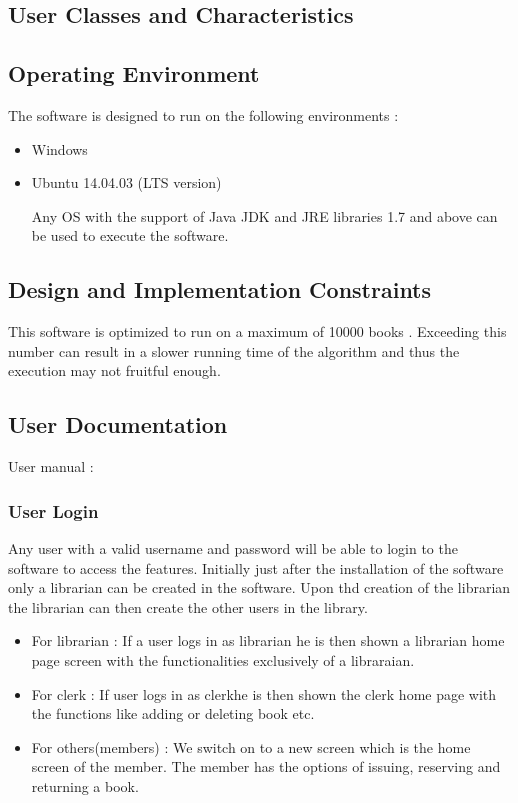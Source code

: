 \documentclass{article}
\begin{document}
\subsection{User Classes and Characteristics}

\subsection{Operating Environment}
The software is designed to run on the following environments :
\begin{itemize}
\item Windows 
\item Ubuntu 14.04.03 (LTS version)

Any OS with the support of Java JDK and JRE libraries 1.7 and above can be used to execute the software.
\end{itemize}

\subsection{Design and Implementation Constraints}
This software is optimized to run on a maximum of 10000 books .
Exceeding this number can result in a slower running time of the algorithm and thus the execution may not fruitful enough.

\subsection{User Documentation}
User manual $:$

\subsubsection*{User Login}
Any user with a valid username and password will be able to login to the software to access the features. Initially just after the installation of the software only a librarian can be created in the software. Upon thd creation of the librarian the librarian can then create the other users in the library.
\begin{itemize}
\item For librarian : If a user logs in as librarian he is then shown a librarian home page screen with the functionalities exclusively of a libraraian.
\item For clerk : If user logs in as clerkhe is then shown the clerk home page with the functions like adding or deleting book etc.
\item For others(members) : We switch on to a new screen which is the home screen of the member. The member has the options of issuing, reserving and returning a book.
\end{itemize}
\end{document}
